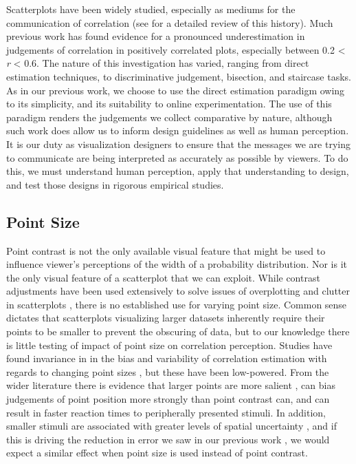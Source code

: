 \documentclass{vgtc}                          %
\begin{document}
Scatterplots have been widely studied, especially as mediums for the communication
of correlation (see \cite{strain_2023} for a detailed review of this history). Much
previous work has found evidence for a pronounced underestimation in judgements
of correlation in positively correlated plots, especially between 0.2 \textless{} \emph{r} \textless{} 0.6. The
nature of this investigation has varied, ranging from direct estimation techniques,
to discriminative judgement, bisection, and staircase tasks. As in our previous work,
we choose to use the direct estimation paradigm owing to its simplicity, and its suitability
to online experimentation. The use of this paradigm renders the judgements we collect
comparative by nature, although such work does allow us to inform design guidelines as
well as human perception. It is our duty as visualization designers to ensure that the
messages we are trying to communicate are being interpreted as accurately as possible
by viewers. To do this, we must understand human perception, apply that understanding
to design, and test those designs in rigorous empirical studies.

\hypertarget{point-size}{%
\subsection{Point Size}\label{point-size}}

Point contrast is not the only available visual feature that might be used
to influence viewer's perceptions of the width of a probability distribution. Nor is
it the only visual feature of a scatterplot that we can exploit. While
contrast adjustments have been used extensively to solve issues of overplotting and clutter
in scatterplots \cite{matejka_2015, bertini_2004}, there is no established use for
varying point size. Common sense dictates that scatterplots visualizing larger
datasets inherently require their points to be smaller to prevent the obscuring of data,
but to our knowledge there is little testing of impact of point size on correlation perception.
Studies have found invariance in in the bias and variability of correlation
estimation with regards to changing point sizes \cite{rensink_2012, rensink_2014},
but these have been low-powered. From the wider literature there is evidence that larger points
are more salient \cite{healey_2012}, can bias judgements of point position
\cite{hong_2021} more strongly than point contrast can, and can result in faster reaction times \cite{grice_1983} to peripherally presented stimuli. In addition, smaller stimuli are associated with
greater levels of spatial uncertainty \cite{alais_2004}, and if this
is driving the reduction in error we saw in our previous work \cite{strain_2023},
we would expect a similar effect when point size is used instead of point contrast.
\end{document}
